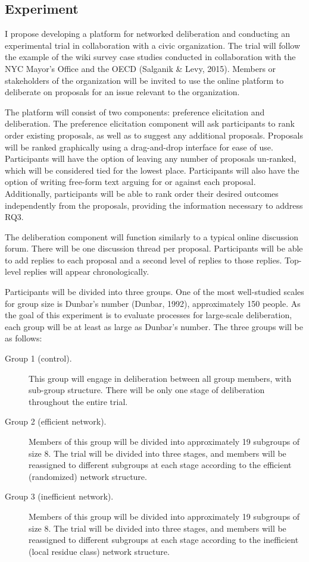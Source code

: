 \subsection{Experiment}
I propose developing a platform for networked deliberation and conducting an experimental trial in collaboration with a civic organization. The trial will follow the example of the wiki survey case studies conducted in collaboration with the NYC Mayor’s Office and the OECD (Salganik \& Levy, 2015). Members or stakeholders of the organization will be invited to use the online platform to deliberate on proposals for an issue relevant to the organization.

The platform will consist of two components: preference elicitation and deliberation. The preference elicitation component will ask participants to rank order existing proposals, as well as to suggest any additional proposals. Proposals will be ranked graphically using a drag-and-drop interface for ease of use. Participants will have the option of leaving any number of proposals un-ranked, which will be considered tied for the lowest place. Participants will also have the option of writing free-form text arguing for or against each proposal.
Additionally, participants will be able to rank order their desired outcomes independently from the proposals, providing the information necessary to address RQ3.

The deliberation component will function similarly to a typical online discussion forum. There will be one discussion thread per proposal. Participants will be able to add replies to each proposal and a second level of replies to those replies. Top-level replies will appear chronologically.

Participants will be divided into three groups. One of the most well-studied scales for group size is Dunbar’s number (Dunbar, 1992), approximately 150 people. As the goal of this experiment is to evaluate processes for large-scale deliberation, each group will be at least as large as Dunbar’s number. The three groups will be as follows:
\begin{description}
\item[Group 1 (control).]{This group will engage in deliberation between all group members, with sub-group structure. There will be only one stage of deliberation throughout the entire trial.}
\item[Group 2 (efficient network).]{Members of this group will be divided into approximately 19 subgroups of size 8. The trial will be divided into three stages, and members will be reassigned to different subgroups at each stage according to the efficient (randomized) network structure.}
\item[Group 3 (inefficient network).]{Members of this group will be divided into approximately 19 subgroups of size 8. The trial will be divided into three stages, and members will be reassigned to different subgroups at each stage according to the inefficient (local residue class) network structure.}
\end{description}

